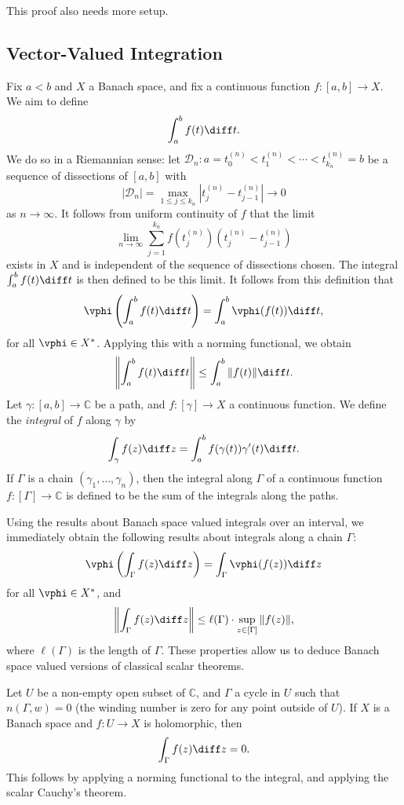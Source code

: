 \documentclass[12pt]{article}
\begin{document}
This proof also needs more setup.

\subsection{Vector-Valued Integration}%
\label{sub:vvi}

Fix $a < b$ and $X$ a Banach space, and fix a continuous function $f : [a, b] \to X$. We aim to define
\[
\int_a^b f(t) \diff t.
\]
We do so in a Riemannian sense: let $\mathcal{D}_n : a = t_0^{(n)} < t_1^{(n)} < \cdots < t_{k_n}^{(n)} = b$ be a sequence of dissections of $[a, b]$ with
\[
|\mathcal{D}_n| = \max_{1 \leq j \leq k_n} |t_{j}^{(n)} - t_{j-1}^{(n)}| \to 0
\]
as $n \to \infty$. It follows from uniform continuity of $f$ that the limit
\[
\lim_{n \to \infty} \sum_{j = 1}^{k_n} f(t_j^{(n)}) (t_j^{(n)} - t_{j-1}^{(n)})
\]
exists in $X$ and is independent of the sequence of dissections chosen. The integral $\int_a^b f(t) \diff t$ is then defined to be this limit. It follows from this definition that
\[
\vphi\left( \int_a^b f(t) \diff t \right) = \int_a^b \vphi(f(t)) \diff t,
\]
for all $\vphi \in X^{\ast}$. Applying this with a norming functional, we obtain
\[
\left\| \int_a^b f(t) \diff t \right\| \leq \int_a^b \|f(t)\| \diff t.
\]
Let $\gamma : [a, b] \to \mathbb{C}$ be a path, and $f : [\gamma] \to X$ a continuous function. We define the \emph{integral} of $f$ along $\gamma$ by
\[
\int_\gamma f(z) \diff z = \int_a^b f(\gamma(t)) \gamma'(t) \diff t.
\]
If $\Gamma$ is a chain $(\gamma_1, \ldots, \gamma_n)$, then the integral along $\Gamma$ of a continuous function $f : [\Gamma] \to \mathbb{C}$ is defined to be the sum of the integrals along the paths.

Using the results about Banach space valued integrals over an interval, we immediately obtain the following results about integrals along a chain $\Gamma$:
\[
\vphi \left( \int_\Gamma f(z) \diff z \right) = \int_\Gamma \vphi(f(z)) \diff z
\]
for all $\vphi \in X^{\ast}$, and
\[
	\left\| \int_\Gamma f(z) \diff z \right\| \leq \ell(\Gamma) \cdot \sup_{z \in [\Gamma]} \|f(z)\|,
\]
where $\ell(\Gamma)$ is the length of $\Gamma$. These properties allow us to deduce Banach space valued versions of classical scalar theorems.

Let $U$ be a non-empty open subset of $\mathbb{C}$, and $\Gamma$ a cycle in $U$ such that $n(\Gamma, w) = 0$ (the winding number is zero for any point outside of $U$). If $X$ is a Banach space and $f : U \to X$ is holomorphic, then
\[
\int_\Gamma f(z) \diff z = 0.
\]
This follows by applying a norming functional to the integral, and applying the scalar Cauchy's theorem.
\end{document}
